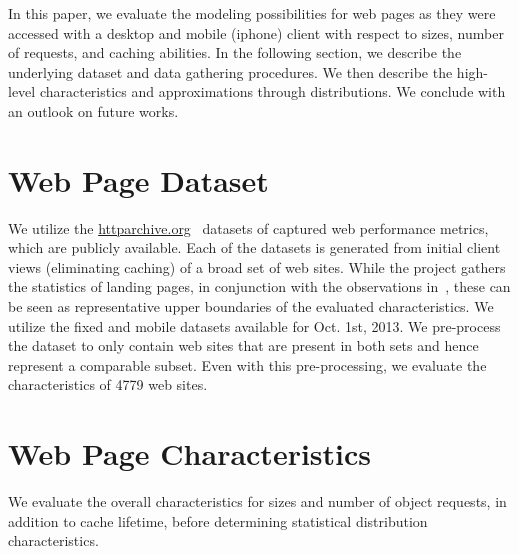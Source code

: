 \documentclass[letterpaper,conference]{IEEEtran}
\begin{document}
In this paper, we evaluate the modeling possibilities for web pages as they were accessed with a desktop and mobile (iphone) client with respect to sizes, number of requests, and caching abilities.
In the following section, we describe the underlying dataset and data gathering procedures. We then describe the high-level characteristics and approximations through distributions.
We conclude with an outlook on future works.

\section{Web Page Dataset}
We utilize the \url{httparchive.org}~\cite{ht13} datasets of captured web performance metrics, which are publicly available. 
Each of the datasets is generated from initial client views (eliminating caching) of a broad set of web sites. 
While the project gathers the statistics of landing pages, in conjunction with the observations in~\cite{BuMaSe13}, these can be seen as representative upper boundaries of the evaluated characteristics.
We utilize the fixed and mobile datasets available for Oct. 1st, 2013. 
We pre-process the dataset to only contain web sites that are present in both sets and hence represent a comparable subset. 
Even with this pre-processing, we evaluate the characteristics of 4779 web sites.
\section{Web Page Characteristics}
We evaluate the overall characteristics for sizes and number of object requests, in addition to cache lifetime, before determining statistical distribution characteristics.
\end{document}
